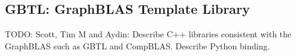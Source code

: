 \subsection{GBTL: GraphBLAS Template Library}

TODO: Scott, Tim M and Aydin:
Describe C++ libraries consistent with the GraphBLAS such as GBTL and CompBLAS.
Describe Python binding.

